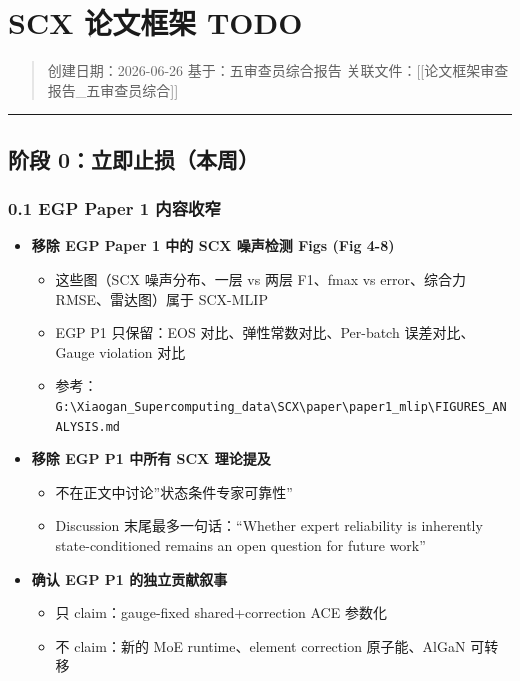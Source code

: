 \documentclass[
  12pt,
]{ctexart}
\author{SCX}
\date{2026}
\providecommand{\tightlist}{%
  \setlength{\itemsep}{0pt}\setlength{\parskip}{0pt}}
\begin{document}
\section{SCX 论文框架 TODO}\label{scx-ux8bbaux6587ux6846ux67b6-todo}

\begin{quote}
创建日期：2026-06-26 基于：五审查员综合报告
关联文件：{[}{[}论文框架审查报告\_五审查员综合{]}{]}
\end{quote}

\begin{center}\rule{0.5\linewidth}{0.5pt}\end{center}

\subsection{阶段
0：立即止损（本周）}\label{ux9636ux6bb5-0ux7acbux5373ux6b62ux635fux672cux5468}

\subsubsection{0.1 EGP Paper 1
内容收窄}\label{egp-paper-1-ux5185ux5bb9ux6536ux7a84}

\begin{itemize}
\tightlist
\item[$\square$]
  \textbf{移除 EGP Paper 1 中的 SCX 噪声检测 Figs (Fig 4-8)}

  \begin{itemize}
  \tightlist
  \item
    这些图（SCX 噪声分布、一层 vs 两层 F1、fmax vs error、综合力
    RMSE、雷达图）属于 SCX-MLIP
  \item
    EGP P1 只保留：EOS 对比、弹性常数对比、Per-batch 误差对比、Gauge
    violation 对比
  \item
    参考：\texttt{G:\textbackslash{}Xiaogan\_Supercomputing\_data\textbackslash{}SCX\textbackslash{}paper\textbackslash{}paper1\_mlip\textbackslash{}FIGURES\_ANALYSIS.md}
  \end{itemize}
\item[$\square$]
  \textbf{移除 EGP P1 中所有 SCX 理论提及}

  \begin{itemize}
  \tightlist
  \item
    不在正文中讨论''状态条件专家可靠性''
  \item
    Discussion 末尾最多一句话：``Whether expert reliability is
    inherently state-conditioned remains an open question for future
    work''
  \end{itemize}
\item[$\square$]
  \textbf{确认 EGP P1 的独立贡献叙事}

  \begin{itemize}
  \tightlist
  \item
    只 claim：gauge-fixed shared+correction ACE 参数化
  \item
    不 claim：新的 MoE runtime、element correction 原子能、AlGaN 可转移
  \end{itemize}
\end{itemize}
\end{document}
